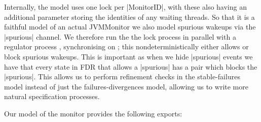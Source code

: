 
Internally, the model uses one lock per |MonitorID|, with these also having an additional parameter storing the identities of any waiting threads. So that it is a faithful model of an actual JVMMonitor we also model spurious wakeups via the |spurious| channel. We therefore run the the lock process in parallel with a regulator process , synchronising on ; this  nondeterministically either allows or block spurious wakeups. This is important as when we hide |spurious| events we have that every state in FDR that allows a |spurious| has a pair which blocks the |spurious|. This allows us to perform refinement checks in the stable-failures model instead of just the failures-divergences model, allowing us to write more natural specification processes.

Our model of the monitor provides the following exports:

